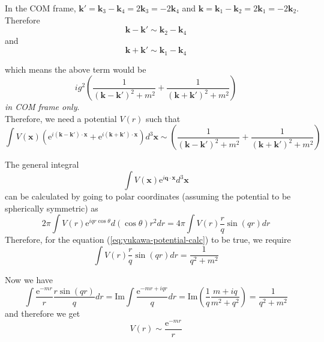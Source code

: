 \documentclass[11pt]{article}
\newcommand{\e}{\mathrm{e}}
\numberwithin{equation}{section}
\begin{document}
    In the COM frame, \(\textbf{k}' = \textbf{k}_3 - \textbf{k}_4 = 2\textbf{k}_3 = -2\textbf{k}_4\) and \(\textbf{k} = \textbf{k}_1 - \textbf{k}_2 = 2\textbf{k}_1 = -2\textbf{k}_2\). Therefore 
    \begin{equation*}
        \textbf{k} - \textbf{k}' \sim \textbf{k}_2 -  \textbf{k}_4
    \end{equation*}
    and  
    \begin{equation*}
        \textbf{k} + \textbf{k}' \sim \textbf{k}_1 -  \textbf{k}_4
    \end{equation*}

    which means the above term would be 
    \begin{equation}
        ig^2\left( \frac{1}{(\textbf{k} - \textbf{k}')^2 + m^2} + \frac{1}{(\textbf{k} + \textbf{k}')^2 + m^2 } \right)
    \end{equation}
    \textit{in COM frame only}.\\

    Therefore, we need a potential \(V(r)\) such that 
    \begin{equation*}
        \int V(\textbf{x}) \left( \e^{i(\textbf{k} - \textbf{k}') \cdot \textbf{x}} + \e^{i(\textbf{k} + \textbf{k}') \cdot \textbf{x}}\right)d^3\textbf{x} \sim \left( \frac{1}{(\textbf{k} - \textbf{k}')^2 + m^2} + \frac{1}{(\textbf{k} + \textbf{k}')^2 + m^2 } \right)
        \label{eq:yukawa-potential-calc}
    \end{equation*}

    The general integral 
    \begin{equation*}
        \int V(\textbf{x})\e^{i\textbf{q}\cdot \textbf{x}}d^3\textbf{x}
    \end{equation*}
    can be calculated by going to polar coordinates (assuming the potential to be spherically symmetric) as
    \begin{equation*}
        2\pi \int V(r) \e^{iqr\cos\theta} d(\cos\theta)r^2dr = 4\pi \int V(r)\frac{r}{q} \sin(qr) dr
    \end{equation*}
    Therefore, for the equation (\ref{eq:yukawa-potential-calc}) to be true, we require
    \begin{equation*}
        \int V(r)\frac{r}{q} \sin(qr) dr = \frac{1}{q^2 + m^2}
    \end{equation*}

    Now we have 
    \begin{equation*}
        \int \frac{\e^{-mr}}{r}\frac{r\sin(qr)}{q} dr = \mathrm{Im}\int \frac{\e^{-mr+iqr}}{q} dr = \mathrm{Im}\left(\frac{1}{q}\frac{m+iq}{m^2 + q^2}\right) = \frac{1}{q^2 + m^2}
    \end{equation*}
    and therefore we get 
    \begin{equation*}
        V(r) \sim \frac{\e^{-mr}}{r}
    \end{equation*}
\end{document}
